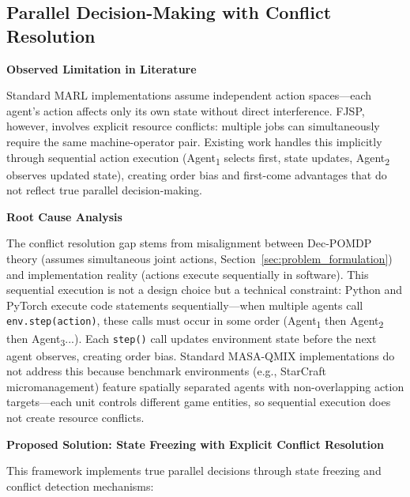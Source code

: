 \subsection{Parallel Decision-Making with Conflict Resolution}
\label{sec:conflict_adaptation}

\textbf{Observed Limitation in Literature}

Standard MARL implementations assume independent action spaces—each agent's action affects only its own state without direct interference. FJSP, however, involves explicit resource conflicts: multiple jobs can simultaneously require the same machine-operator pair. Existing work handles this implicitly through sequential action execution (Agent\textsubscript{1} selects first, state updates, Agent\textsubscript{2} observes updated state), creating order bias and first-come advantages that do not reflect true parallel decision-making.

\textbf{Root Cause Analysis}

The conflict resolution gap stems from misalignment between Dec-POMDP theory (assumes simultaneous joint actions, Section~\ref{sec:problem_formulation}) and implementation reality (actions execute sequentially in software). This sequential execution is not a design choice but a technical constraint: Python and PyTorch execute code statements sequentially—when multiple agents call \texttt{env.step(action)}, these calls must occur in some order (Agent\textsubscript{1} then Agent\textsubscript{2} then Agent\textsubscript{3}...). Each \texttt{step()} call updates environment state before the next agent observes, creating order bias. Standard MASA-QMIX implementations do not address this because benchmark environments (e.g., StarCraft micromanagement) feature spatially separated agents with non-overlapping action targets—each unit controls different game entities, so sequential execution does not create resource conflicts.

\textbf{Proposed Solution: State Freezing with Explicit Conflict Resolution}

This framework implements true parallel decisions through state freezing and conflict detection mechanisms:

